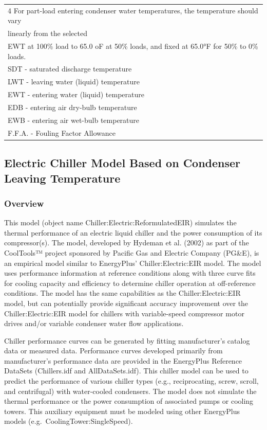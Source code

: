 \begin{longtable}[c]{p{1.2in}p{1.2in}p{1.2in}p{1.2in}p{1.2in}}
\multicolumn{5}{l}{4 For part-load entering condenser water temperatures, the temperature should vary} \tabularnewline
\multicolumn{5}{l}{linearly from  the selected} \tabularnewline
\multicolumn{5}{l}{EWT at 100\% load to 65.0 oF at 50\% loads, and fixed at 65.0°F for 50\% to 0\% loads.} \tabularnewline
\multicolumn{5}{l}{SDT - saturated discharge temperature} \tabularnewline
\multicolumn{5}{l}{LWT - leaving water (liquid) temperature} \tabularnewline
\multicolumn{5}{l}{EWT - entering water (liquid) temperature} \tabularnewline
\multicolumn{5}{l}{EDB - entering air dry-bulb temperature} \tabularnewline
\multicolumn{5}{l}{EWB - entering air wet-bulb temperature} \tabularnewline
\multicolumn{5}{l}{F.F.A. - Fouling Factor Allowance} \tabularnewline
\bottomrule
\end{longtable}

\subsection{Electric Chiller Model Based on Condenser Leaving Temperature}\label{electric-chiller-model-based-on-condenser-leaving-temperature}

\subsubsection{Overview}\label{overview-3-002}

This model (object name Chiller:Electric:ReformulatedEIR) simulates the thermal performance of an electric liquid chiller and the power consumption of its compressor(s). The model, developed by Hydeman et al. (2002) as part of the CoolTools™ project sponsored by Pacific Gas and Electric Company (PG\&E), is an empirical model similar to EnergyPlus' Chiller:Electric:EIR model. The model uses performance information at reference conditions along with three curve fits for cooling capacity and efficiency to determine chiller operation at off-reference conditions. The model has the same capabilities as the Chiller:Electric:EIR model, but can potentially provide significant accuracy improvement over the Chiller:Electric:EIR model for chillers with variable-speed compressor motor drives and/or variable condenser water flow applications.

Chiller performance curves can be generated by fitting manufacturer's catalog data or measured data. Performance curves developed primarily from manufacturer's performance data are provided in the EnergyPlus Reference DataSets (Chillers.idf and AllDataSets.idf). This chiller model can be used to predict the performance of various chiller types (e.g., reciprocating, screw, scroll, and centrifugal) with water-cooled condensers. The model does not simulate the thermal performance or the power consumption of associated pumps or cooling towers. This auxiliary equipment must be modeled using other EnergyPlus models (e.g.~CoolingTower:SingleSpeed).


